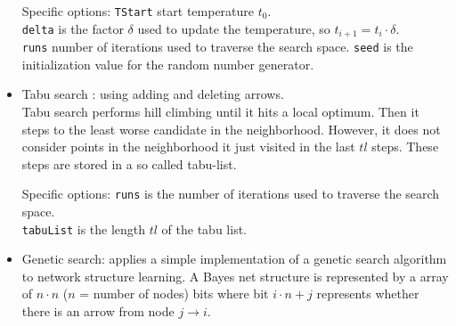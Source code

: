 \documentclass{article}
\begin{document}
\begin{itemize}
\begin{center}
\end{center}

Specific options: {\tt TStart} start temperature $t_0$.\\
{\tt delta} is the factor $\delta$ used to update the temperature, so $t_{i+1}=t_i \cdot \delta$.\\
{\tt runs} number of iterations used to traverse the search space.
{\tt seed} is the initialization value for the random number generator.\\

\item Tabu search \cite{bouck1995}:
using adding and deleting arrows.\\
Tabu search performs hill climbing until it hits a local optimum.
Then it steps to the least worse candidate in the neighborhood. However,
it does not consider points in the neighborhood it just visited in the
last $tl$ steps. These steps are stored in a so called tabu-list.

\begin{center}
\end{center}

Specific options: 
{\tt runs} is the number of iterations used to traverse the search space.\\
{\tt tabuList} is the length $tl$ of the tabu list.

\item Genetic search: applies a simple implementation of a genetic search algorithm
to network structure learning. A Bayes net structure is represented by a array
of $n\cdot n$ ($n$ = number of nodes) bits where bit $i\cdot n + j$ represents whether
there is an arrow from node $j\to i$.\\

\begin{center}
\end{center}


\end{itemize}
\end{document}

